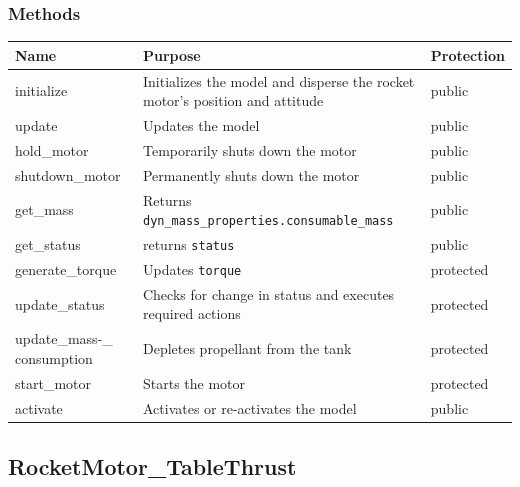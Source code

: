 \documentclass[11pt,fleqn]{report}
\begin{document}
\subsubsection{Methods}
\begin{center}
\begin{longtable}{|p{3cm}|p{10cm}|l|} \hline
\textbf{Name} & \textbf{Purpose} & \textbf{Protection} \\
\hline
\endhead
initialize & Initializes the model and disperse the rocket motor's position and attitude & public \\
\hline
update & Updates the model & public \\
\hline
hold\_motor & Temporarily shuts down the motor & public \\
\hline
shutdown\_motor & Permanently shuts down the motor & public \\
\hline
get\_mass & Returns \verb|dyn_mass_properties.consumable_mass| & public \\
\hline
get\_status & returns \verb|status| & public \\
\hline
generate\_torque & Updates \verb|torque| & protected \\
\hline
update\_status & Checks for change in status and executes required actions & protected \\
\hline
update\_mass-\newline\_ consumption & Depletes propellant from the tank & protected \\
\hline
start\_motor & Starts the motor & protected \\
\hline
activate & Activates or re-activates the model & public \\
\hline
\end{longtable}
\end{center}

\subsection{RocketMotor\_TableThrust}
\end{document}
